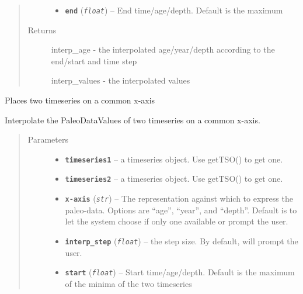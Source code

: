 \documentclass[letterpaper,10pt,english]{sphinxmanual}
\begin{document}
\begin{fulllineitems}
\begin{fulllineitems}
\begin{quote}
\begin{description}
\begin{itemize}
\item {} 
\textbf{\texttt{end}} (\emph{\texttt{float}}) -- End time/age/depth. Default is the maximum

\end{itemize}

\item[{Returns}] \leavevmode

interp\_age - the interpolated age/year/depth according to
the end/start and time step

interp\_values - the interpolated values


\end{description}\end{quote}

\end{fulllineitems}


\begin{fulllineitems}
\label{Basic:pyleoclim.Basic.onCommonXAxis}
Places two timeseries on a common x-axis

Interpolate the PaleoDataValues of two timeseries on a common x-axis.
\begin{quote}\begin{description}
\item[{Parameters}] \leavevmode\begin{itemize}
\item {} 
\textbf{\texttt{timeseries1}} -- a timeseries object. Use getTSO() to get one.

\item {} 
\textbf{\texttt{timeseries2}} -- a timeseries object. Use getTSO() to get one.

\item {} 
\textbf{\texttt{x-axis}} (\emph{\texttt{str}}) -- The representation against which to express the
paleo-data. Options are ``age'', ``year'', and ``depth''.
Default is to let the system choose if only one available
or prompt the user.

\item {} 
\textbf{\texttt{interp\_step}} (\emph{\texttt{float}}) -- the step size. By default, will prompt the user.

\item {} 
\textbf{\texttt{start}} (\emph{\texttt{float}}) -- Start time/age/depth. Default is the maximum of
the minima of the two timeseries


\end{itemize}
\end{description}
\end{quote}
\end{fulllineitems}
\end{fulllineitems}
\end{document}
